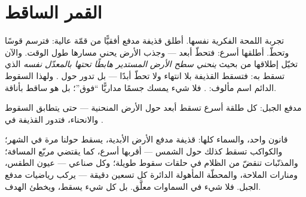 \section{القمر الساقط}

\begin{example}\label{ex:g9:gravitation:cannon}
تجربة اللمحة الفكرية نفسها. أطلق قذيفة مدفع أفقيًّا من قمّة
عالية: فترسم قوسًا وتحطّ. أطلقها أسرع: فتحطّ أبعد --- وجذب
الأرض يحني مسارها طول الوقت. والآن تخيّل إطلاقها من 
بحيث \emph{ينحني سطح الأرض المستدير هابطًا تحتها بالمعدّل
نفسه} الذي تسقط به: فتسقط القذيفة بلا انتهاء ولا تحطّ أبدًا
--- بل تدور حول . ولهذا السقوط الدائم اسم مألوف:
\emph{}. فلا شيء يمسك جسمًا مداريًّا ``فوق''؛ بل هو ساقط
بأناقة.
\end{example}

\begin{omfigure}

{\small مدفع الجبل: كل طلقة أسرع تسقط أبعد حول الأرض المنحنية
--- حتى يتطابق السقوط والانحناء، فتدور القذيفة في .}
\end{omfigure}

\begin{proposition}\label{prop:g9:gravitation:runs}
قانون واحد، والسماء كلها:  قذيفة مدفع الأرض الأبدية،
يسقط حولنا مرة في الشهر؛ والكواكب تسقط كذلك حول الشمس ---
أقربها أسرع، كما يقتضي مربّع المسافة؛ والمذنّبات تنقضّ من
الظلام في حلقات سقوط طويلة؛ وكل  صناعي --- عيون الطقس،
ومنارات الملاحة، والمحطّة المأهولة الدائرة كل تسعين دقيقة ---
يركب رياضيات مدفع الجبل. فلا شيء في السماوات معلَّق. بل كل شيء
يسقط، ويخطئ الهدف.
\end{proposition}

